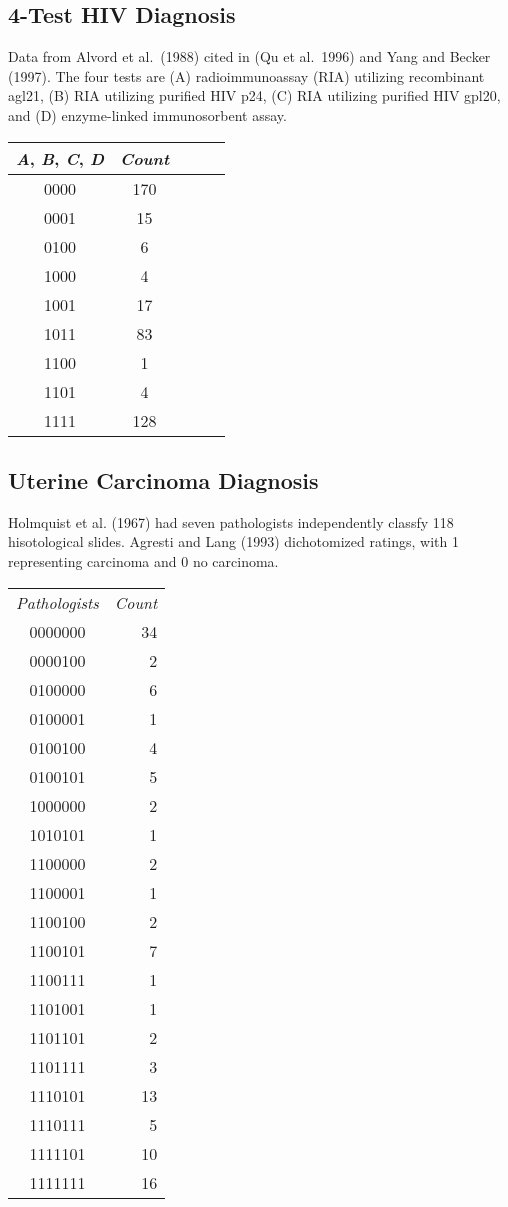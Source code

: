 
\subsection{4-Test HIV Diagnosis}

Data from Alvord et al.~(1988) cited in (Qu et al.~1996) and Yang and
Becker (1997).  The four tests are (A) radioimmunoassay (RIA)
utilizing recombinant agl21, (B) RIA utilizing purified HIV p24, (C)
RIA utilizing purified HIV gpl20, and (D) enzyme-linked immunosorbent
assay.

\begin{tabular}{cccc|r}
{\it A}, {\it B}, {\it C}, {\it D} & {\it Count}
\\ \hline
0000 & 170
\\
0001 & 15
\\
0100 & 6
\\
1000 & 4
\\
1001 & 17
\\
1011 & 83
\\
1100 & 1
\\
1101 & 4
\\
1111 & 128
\\
\end{tabular}



\subsection{Uterine Carcinoma Diagnosis}

Holmquist et al. (1967) had seven pathologists independently classfy
118 hisotological slides.  Agresti and Lang (1993) dichotomized
ratings, with 1 representing carcinoma and 0 no carcinoma.

\begin{tabular}{cr}
{\it Pathologists} & {\it Count} \\
0000000 & 34 \\
0000100 & 2 \\
0100000 & 6 \\
0100001 & 1 \\
0100100 & 4 \\
0100101 & 5 \\
1000000 & 2 \\
1010101 & 1 \\
1100000 & 2 \\
1100001 & 1 \\
1100100 & 2 \\
1100101 & 7 \\
1100111 & 1 \\
1101001 & 1 \\
1101101 & 2 \\
1101111 & 3 \\
1110101 & 13 \\
1110111 & 5 \\
1111101 & 10 \\
1111111 & 16 \\
\end{tabular}



